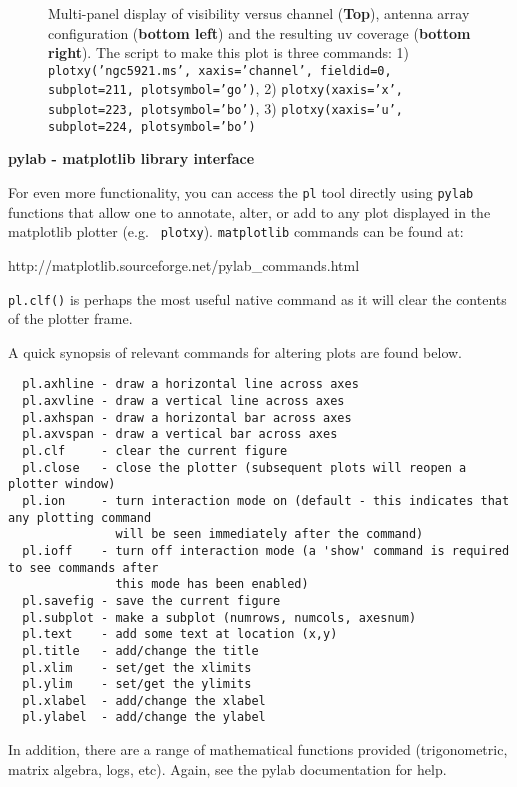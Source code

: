 \begin{figure}[h!]
\caption{\label{fig:multiplot} Multi-panel display of visibility
  versus channel ({\bf Top}), antenna array configuration ({\bf bottom left})
  and the resulting uv coverage ({\bf bottom right}). The script to make
  this plot is three commands: 
  1) {\tt plotxy('ngc5921.ms', xaxis='channel', fieldid=0,
  subplot=211, plotsymbol='go')},
  2) {\tt plotxy(xaxis='x', subplot=223, plotsymbol='bo')}, 
  3) {\tt plotxy(xaxis='u', subplot=224, plotsymbol='bo')} } 
\hrulefill
\end{figure}
 
{\bf pylab - matplotlib library interface}

For even more functionality, you can access the {\tt pl} tool directly
using {\tt pylab} functions that allow one to annotate, alter, or add
to any plot displayed in the matplotlib plotter (e.g. {\tt
plotxy}). {\tt matplotlib} commands can be found at:

http://matplotlib.sourceforge.net/pylab\_commands.html

{\tt pl.clf()} is perhaps the most useful native command as it will
clear the contents of the plotter frame.

A quick synopsis of relevant commands for altering plots are found
below. 

\small
\begin{verbatim}
  pl.axhline - draw a horizontal line across axes
  pl.axvline - draw a vertical line across axes
  pl.axhspan - draw a horizontal bar across axes
  pl.axvspan - draw a vertical bar across axes
  pl.clf     - clear the current figure
  pl.close   - close the plotter (subsequent plots will reopen a plotter window)
  pl.ion     - turn interaction mode on (default - this indicates that any plotting command
               will be seen immediately after the command)
  pl.ioff    - turn off interaction mode (a 'show' command is required to see commands after
               this mode has been enabled)
  pl.savefig - save the current figure
  pl.subplot - make a subplot (numrows, numcols, axesnum)
  pl.text    - add some text at location (x,y)
  pl.title   - add/change the title
  pl.xlim    - set/get the xlimits
  pl.ylim    - set/get the ylimits
  pl.xlabel  - add/change the xlabel
  pl.ylabel  - add/change the ylabel
\end{verbatim}
\normalsize

In addition, there are a range of mathematical functions provided
(trigonometric, matrix algebra, logs, etc). Again, see the pylab
documentation for help.


